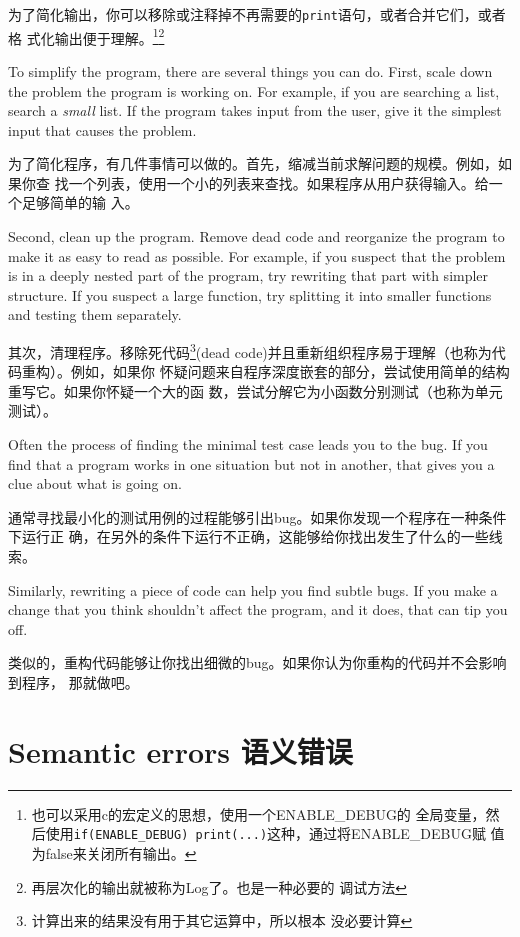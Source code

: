 \documentclass[10pt]{book}
\begin{document}
\begin{CJK}{UTF8}{gbsn}
为了简化输出，你可以移除或注释掉不再需要的{\tt print}语句，或者合并它们，或者格
式化输出便于理解。\footnote{也可以采用c的宏定义的思想，使用一个ENABLE\_DEBUG的
全局变量，然后使用{\tt if(ENABLE\_DEBUG) print(...)}这种，通过将ENABLE\_DEBUG赋
值为false来关闭所有输出。}\footnote{再层次化的输出就被称为Log了。也是一种必要的
调试方法}

To simplify the program, there are several things you can do.  First,
scale down the problem the program is working on.  For example, if you
are searching a list, search a {\em small} list.  If the program takes
input from the user, give it the simplest input that causes the
problem.

为了简化程序，有几件事情可以做的。首先，缩减当前求解问题的规模。例如，如果你查
找一个列表，使用一个小的列表来查找。如果程序从用户获得输入。给一个足够简单的输
入。

Second, clean up the program.  Remove dead code and reorganize the
program to make it as easy to read as possible.  For example, if you
suspect that the problem is in a deeply nested part of the program,
try rewriting that part with simpler structure.  If you suspect a
large function, try splitting it into smaller functions and testing them
separately.

其次，清理程序。移除死代码\footnote{计算出来的结果没有用于其它运算中，所以根本
没必要计算}(dead code)并且重新组织程序易于理解（也称为代码重构）。例如，如果你
怀疑问题来自程序深度嵌套的部分，尝试使用简单的结构重写它。如果你怀疑一个大的函
数，尝试分解它为小函数分别测试（也称为单元测试）。

Often the process of finding the minimal test case leads you to the
bug.  If you find that a program works in one situation but not in
another, that gives you a clue about what is going on.

通常寻找最小化的测试用例的过程能够引出bug。如果你发现一个程序在一种条件下运行正
确，在另外的条件下运行不正确，这能够给你找出发生了什么的一些线索。

Similarly, rewriting a piece of code can help you find subtle
bugs.  If you make a change that you think shouldn't affect the
program, and it does, that can tip you off.

类似的，重构代码能够让你找出细微的bug。如果你认为你重构的代码并不会影响到程序，
那就做吧。

\section{Semantic errors 语义错误}


\end{CJK}
\end{document}
